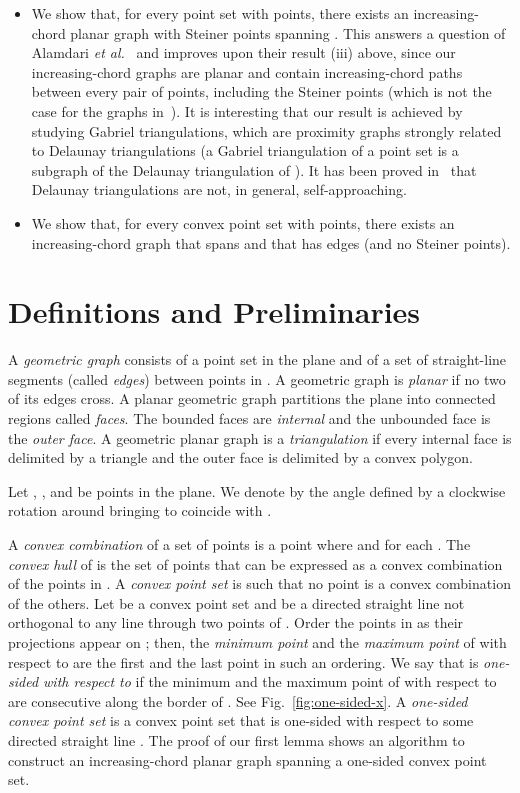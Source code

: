 \documentclass{llncs}
\begin{document}
\begin{itemize}
\item We show that, for every point set  with  points, there exists an increasing-chord planar graph with  Steiner points spanning . This answers a question of Alamdari {\em et al.}~\cite{acglp-sag-12} and improves upon their result (iii) above, since our increasing-chord graphs are planar and contain increasing-chord paths between every pair of points, including the Steiner points (which is not the case for the graphs in~\cite{acglp-sag-12}). It is interesting that our result is achieved by studying Gabriel triangulations, which are proximity graphs strongly related to Delaunay triangulations (a Gabriel triangulation of a point set  is a subgraph of the Delaunay triangulation of ). It has been proved in~\cite{acglp-sag-12} that Delaunay triangulations are not, in general, self-approaching.
\item We show that, for every convex point set  with  points, there exists an increasing-chord graph that spans  and that has  edges (and no Steiner points).
\end{itemize}

\section{Definitions and Preliminaries} \label{se:preliminaries}

A {\em geometric graph}  consists of a point set  in the plane and of a set  of straight-line segments (called {\em edges}) between points in . A geometric graph is {\em planar} if no two of its edges cross. A planar geometric graph partitions the plane into connected regions called {\em faces}. The bounded faces are {\em internal} and the unbounded face is the {\em outer face}. A geometric planar graph is a {\em triangulation} if every internal face is delimited by a triangle and the outer face is delimited by a convex polygon.

Let , , and  be points in the plane. We denote by  the angle defined by a clockwise rotation around  bringing  to coincide with .

A {\em convex combination} of a set of points  is a point  where  and  for each . The {\em convex hull}  of  is the set of points that can be expressed as a convex combination of the points in . A {\em convex point set}  is such that no point is a convex combination of the others. Let  be a convex point set and  be a directed straight line not orthogonal to any line through two points of . Order the points in  as their projections appear on ; then, the {\em minimum point} and the {\em maximum point} of  with respect to  are the first and the last point in such an ordering. We say that  is  {\em one-sided with respect to } if the minimum and the maximum point of  with respect to  are consecutive along the border of . See Fig.~\ref{fig:one-sided-x}. A {\em one-sided convex point set} is a convex point set that is one-sided with respect to some directed straight line . The proof of our first lemma shows an algorithm to construct an increasing-chord planar graph spanning a one-sided convex point set.
\end{document}
